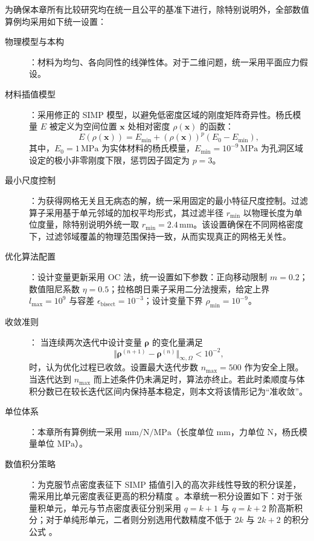 为确保本章所有比较研究均在统一且公平的基准下进行，除特别说明外，全部数值算例均采用如下统一设置：
\begin{description}
	\item[物理模型与本构]：材料为均匀、各向同性的线弹性体。对于二维问题，统一采用平面应力假设。

	\item [材料插值模型]：采用修正的 SIMP 模型，以避免低密度区域的刚度矩阵奇异性。杨氏模量 $E$ 被定义为空间位置 $\boldsymbol{x}$ 处相对密度 $\rho(\boldsymbol{x})$ 的函数：
	\[
	E(\rho(\boldsymbol{x})) = E_{\min} + (\rho(\boldsymbol{x}))^p (E_0 - E_{\min}),
	\]
	其中，$E_0 = 1\,\mathrm{MPa}$ 为实体材料的杨氏模量，$E_{\min} = 10^{-9}\,\mathrm{MPa}$ 为孔洞区域设定的极小非零刚度下限，惩罚因子固定为 $p=3$。
	
	\item [最小尺度控制]：为获得网格无关且无病态的解，统一采用固定的最小特征尺度控制。过滤算子采用基于单元邻域的加权平均形式，其过滤半径 $r_{\min}$ 以物理长度为单位度量，除特别说明外统一取 $r_{\min} = 2.4\,\mathrm{mm}$。该设置确保在不同网格密度下，过滤邻域覆盖的物理范围保持一致，从而实现真正的网格无关性。
	
	\item [优化算法配置]：设计变量更新采用 OC 法，统一设置如下参数：正向移动限制 $m=0.2$；数值阻尼系数 $\eta=0.5$；拉格朗日乘子采用二分法搜索，给定上界 $l_{\max}=10^9$ 与容差 $\epsilon_{\text{bisect}}=10^{-3}$；设计变量下界 $\rho_{\min}=10^{-9}$。
		
	\item [收敛准则]： 当连续两次迭代中设计变量 $\boldsymbol{\rho}$ 的变化量满足 
	\[
	\Vert\boldsymbol{\rho}^{(n+1)} - \boldsymbol{\rho}^{(n)}\Vert_{\infty,\Omega} < 10^{-2},
	\]
	时，认为优化过程已收敛。设置最大迭代步数 $n_{\max} = 500$ 作为安全上限。当迭代达到 $n_{\max}$ 而上述条件仍未满足时，算法亦终止。若此时柔顺度与体积分数已在较长迭代区间内保持基本稳定，则本文将该情形记为“准收敛”。
	
	\item [单位体系]：本章所有算例统一采用 $\mathrm{mm}/\mathrm{N}/\mathrm{MPa}$（长度单位 $\mathrm{mm}$，力单位 $\mathrm{N}$，杨氏模量单位 $\mathrm{MPa}$）。
	
	\item [数值积分策略]：为克服节点密度表征下 SIMP 插值引入的高次非线性导致的积分误差，需采用比单元密度表征更高的积分精度 。本章统一积分设置如下：对于张量积单元，单元与节点密度表征分别采用 $q=k+1$ 与 $q=k+2$ 阶高斯积分；对于单纯形单元，二者则分别选用代数精度不低于 $2k$ 与 $2k+2$ 的积分公式 。

\end{description}


